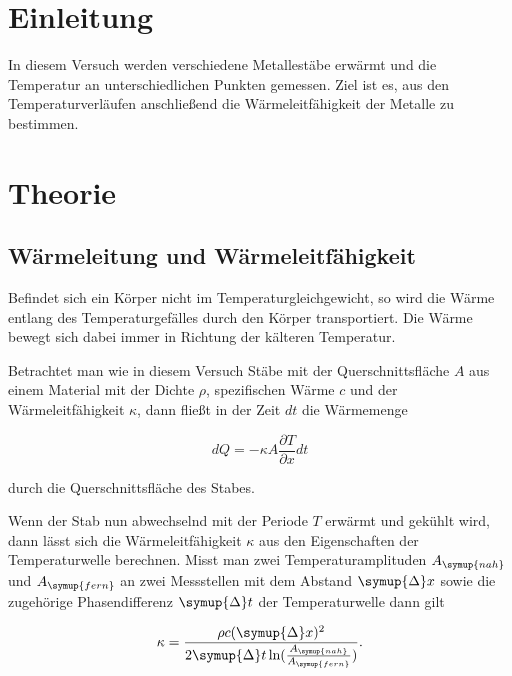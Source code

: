 \section{Einleitung}
\label{sec:Einleitung}

In diesem Versuch werden verschiedene Metallestäbe erwärmt und die Temperatur an unterschiedlichen Punkten gemessen.
Ziel ist es, aus den Temperaturverläufen anschließend die Wärmeleitfähigkeit der Metalle zu bestimmen. 

\section{Theorie}
\label{sec:Theorie}

\subsection{Wärmeleitung und Wärmeleitfähigkeit}
\label{sec:Wärmeleitung und Wärmeleitfähigkeit}

Befindet sich ein Körper nicht im Temperaturgleichgewicht, so wird die Wärme entlang des Temperaturgefälles durch
den Körper transportiert. Die Wärme bewegt sich dabei immer in Richtung der kälteren Temperatur.

Betrachtet man wie in diesem Versuch Stäbe mit der Querschnittsfläche $A$ aus einem Material mit der Dichte $\rho$, 
spezifischen Wärme $c$ und der Wärmeleitfähigkeit $\kappa$, dann fließt in der Zeit $dt$ die Wärmemenge

\begin{equation}
    dQ = -\kappa A\frac{\partial T}{\partial x}dt
    \label{eq:Wärmemenge}
\end{equation}

durch die Querschnittsfläche des Stabes. \cite{v204}

Wenn der Stab nun abwechselnd mit der Periode $T$ erwärmt und gekühlt wird, dann lässt sich die Wärmeleitfähigkeit
$\kappa$ aus den Eigenschaften der Temperaturwelle berechnen.
Misst man zwei Temperaturamplituden $A_{\symup{nah}}$ und $A_{\symup{fern}}$ an zwei Messstellen mit dem Abstand $\symup{\Delta} x$
sowie die zugehörige Phasendifferenz $\symup{\Delta} t$ der Temperaturwelle dann gilt

\begin{equation}
    \kappa =\frac{\rho c(\symup{\Delta} x)^{2}}{2\symup{\Delta} t\,\textup{ln}(\frac{A_{\symup{nah}}}{A_{\symup{fern}}})}.
    \label{eq:Kappa}
\end{equation}

